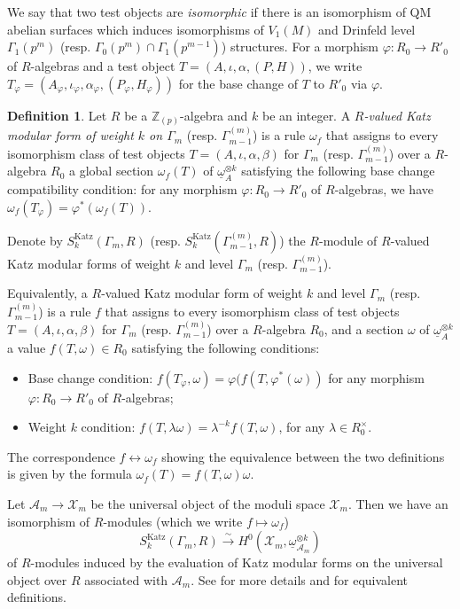 \documentclass[a4paper,11pt]{amsart}
\numberwithin{equation}{section}
\theoremstyle{plain}
\theoremstyle{definition}
\newtheorem{definition}[theorem]{Definition}
\theoremstyle{remark}
\newcommand{\Z}{\mathbb{Z}}
\newcommand{\Katz}{\mathrm{Katz}}
\begin{document}
{We say that two test objects are \emph{isomorphic} if there is an isomorphism of QM abelian surfaces which induces isomorphisms of $V_1(M)$ and Drinfeld level $\Gamma_1(p^m)$ (resp. $\Gamma_0(p^{m})\cap\Gamma_1(p^{m-1})$) structures. For a morphism $\varphi\colon R_0 \rightarrow R'_0$ of $R$-algebras and a test object $T=(A,\iota,\alpha,(P,H))$, we write $T_\varphi=(A_\varphi,\iota_\varphi,\alpha_\varphi,(P_\varphi,H_\varphi))$ for the base change of $T$ to $R'_0$ via $\varphi$.

\begin{definition}\label{def-modforms} Let $R$ be a $\Z_{(p)}$-algebra and $k$ be an integer. A \emph{$R$-valued Katz modular form of weight $k$ on $\Gamma_m$} (resp. $\Gamma^{(m)}_{m-1}$) is a rule $\omega_f$ that assigns to every isomorphism class of test objects $T=(A,\iota,\alpha,\beta)$ for $\Gamma_m$ (resp. $\Gamma^{(m)}_{m-1}$) over a $R$-algebra $R_0$ 
a global section $\omega_f(T)$ of $\underline{\omega}_A^{\otimes k}$ satisfying the following base change
compatibility condition: for any morphism $\varphi\colon R_0 \rightarrow R'_0$ of $R$-algebras, we have $\omega_f(T_\varphi) = \varphi^*(\omega_f(T))$.
\end{definition}

Denote by $S_k^\Katz(\Gamma_m,R)$ (resp. $S_k^\Katz(\Gamma^{(m)}_{m-1},R)$) the $R$-module of $R$-valued Katz modular forms of weight $k$ and level $\Gamma_m$ (resp. $\Gamma^{(m)}_{m-1}$).

Equivalently, a $R$-valued Katz modular form of weight $k$ and level $\Gamma_m$ (resp. $\Gamma^{(m)}_{m-1}$) is a rule $f$ that assigns to every isomorphism class of test objects $T=(A,\iota,\alpha,\beta)$ for $\Gamma_m$ (resp. $\Gamma^{(m)}_{m-1}$) over a $R$-algebra $R_0$, and a section $\omega$ of $\underline{\omega}_A^{\otimes k}$  
a value $f(T,\omega)\in R_0$ satisfying the following conditions: 
\begin{itemize}
    \item Base change condition: $f(T_\varphi,\omega) = \varphi(f(T,\varphi^*(\omega))$ for any morphism $\varphi\colon R_0 \rightarrow R'_0$ of $R$-algebras; 
    \item Weight $k$ condition: $f(T,\lambda\omega) =
\lambda^{-k}f(T,\omega)
		$, for any $\lambda\in R_0^\times$.	 
\end{itemize} The correspondence $f\leftrightarrow\omega_f$ showing the equivalence between the two definitions is given by the formula $\omega_f(T)=f(T,\omega)\omega$.

Let $\mathcal{A}_m\rightarrow\mathcal{X}_m$ be the universal object of the moduli space $\mathcal{X}_m$. Then we have an isomorphism of $R$-modules (which we write $f\mapsto \omega_f$)
\[S_k^\Katz(\Gamma_m,R)\overset\sim\longrightarrow H^0(\mathcal{X}_m,\underline{\omega}_{\mathcal{A}_m}^{\otimes k})\] of $R$-modules induced by the evaluation of Katz modular forms on the universal object over $R$ associated with $\mathcal{A}_m$. See \cite[\S3.1]{Brooks} for more details and for equivalent definitions.

}
\end{document}
